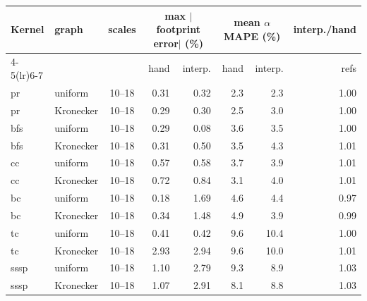 \begin{tabular}{llcrrrrr}
\toprule
Kernel & graph & scales & \multicolumn{2}{c}{max $|$footprint error$|$ (\%)} & \multicolumn{2}{c}{mean $\alpha$ MAPE (\%)} & interp./hand \\
\cmidrule(lr){4-5}\cmidrule(lr){6-7}
 & & & hand & interp. & hand & interp. & refs \\
\midrule
pr & uniform & 10--18 & 0.31 & 0.32 & 2.3 & 2.3 & 1.00 \\
pr & Kronecker & 10--18 & 0.29 & 0.30 & 2.5 & 3.0 & 1.00 \\
bfs & uniform & 10--18 & 0.29 & 0.08 & 3.6 & 3.5 & 1.00 \\
bfs & Kronecker & 10--18 & 0.31 & 0.50 & 3.5 & 4.3 & 1.01 \\
cc & uniform & 10--18 & 0.57 & 0.58 & 3.7 & 3.9 & 1.01 \\
cc & Kronecker & 10--18 & 0.72 & 0.84 & 3.1 & 4.0 & 1.01 \\
bc & uniform & 10--18 & 0.18 & 1.69 & 4.6 & 4.4 & 0.97 \\
bc & Kronecker & 10--18 & 0.34 & 1.48 & 4.9 & 3.9 & 0.99 \\
tc & uniform & 10--18 & 0.41 & 0.42 & 9.6 & 10.4 & 1.00 \\
tc & Kronecker & 10--18 & 2.93 & 2.94 & 9.6 & 10.0 & 1.01 \\
sssp & uniform & 10--18 & 1.10 & 2.79 & 9.3 & 8.9 & 1.03 \\
sssp & Kronecker & 10--18 & 1.07 & 2.91 & 8.1 & 8.8 & 1.03 \\
\bottomrule
\end{tabular}
